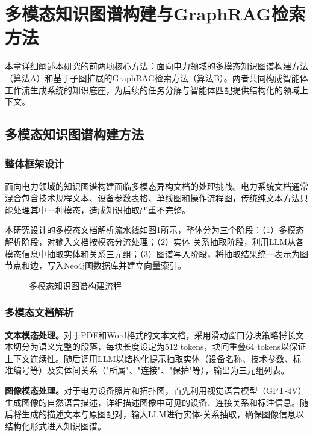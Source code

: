 \section{多模态知识图谱构建与GraphRAG检索方法}

本章详细阐述本研究的前两项核心方法：面向电力领域的多模态知识图谱构建方法（算法A）和基于子图扩展的GraphRAG检索方法（算法B）。两者共同构成智能体工作流生成系统的知识底座，为后续的任务分解与智能体匹配提供结构化的领域上下文。

\subsection{多模态知识图谱构建方法}

\subsubsection{整体框架设计}

面向电力领域的知识图谱构建面临多模态异构文档的处理挑战。电力系统文档通常混合包含技术规程文本、设备参数表格、单线图和操作流程图，传统纯文本方法只能处理其中一种模态，造成知识抽取严重不完整。

本研究设计的多模态文档解析流水线如图\ref{fig:kg_pipeline}所示，整体分为三个阶段：（1）多模态解析阶段，对输入文档按模态分流处理；（2）实体-关系抽取阶段，利用LLM从各模态信息中抽取实体和关系三元组；（3）图谱写入阶段，将抽取结果统一表示为图节点和边，写入Neo4j图数据库并建立向量索引。

\begin{figure}[htbp]
\centering

\caption{多模态知识图谱构建流程}
\label{fig:kg_pipeline}
\end{figure}

\subsubsection{多模态文档解析}

\textbf{文本模态处理。}对于PDF和Word格式的文本文档，采用滑动窗口分块策略将长文本切分为语义完整的段落，每块长度设定为512 tokens，块间重叠64 tokens以保证上下文连续性。随后调用LLM以结构化提示抽取实体（设备名称、技术参数、标准编号等）及实体间关系（"所属"、"连接"、"保护"等），输出为三元组列表。

\textbf{图像模态处理。}对于电力设备照片和拓扑图，首先利用视觉语言模型（GPT-4V）生成图像的自然语言描述，详细描述图像中可见的设备、连接关系和标注信息。随后将生成的描述文本与原图配对，输入LLM进行实体-关系抽取，确保图像信息以结构化形式进入知识图谱。

